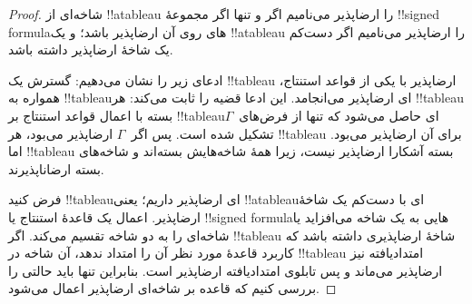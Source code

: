 \documentclass[../../../include/open-logic-section]{subfiles}
\begin{document}
\begin{proof}
شاخه‌ای از !!a{tableau} را ارضاپذیر می‌نامیم اگر و تنها اگر مجموعهٔ
!!{signed formula}های روی آن ارضاپذیر باشد؛ و یک !!a{tableau} را
ارضاپذیر می‌نامیم اگر دست‌کم یک شاخهٔ ارضاپذیر داشته باشد.

ادعای زیر را نشان می‌دهیم: گسترش یک !!{tableau} ارضاپذیر با یکی از
قواعد استنتاج، همواره به !!{tableau}ای ارضاپذیر می‌انجامد. این ادعا
قضیه را ثابت می‌کند: هر !!{tableau} بسته با اعمال قواعد استنتاج بر
!!{tableau}ای حاصل می‌شود که تنها از فرض‌های~$\Gamma$ تشکیل شده است.
پس اگر~$\Gamma$ ارضاپذیر می‌بود، هر !!{tableau} برای آن ارضاپذیر
می‌بود. اما !!{tableau} بسته آشکارا ارضاپذیر نیست، زیرا همهٔ شاخه‌هایش
بسته‌اند و شاخه‌های بسته ارضاناپذیرند.

فرض کنید !!{tableau}ای ارضاپذیر داریم؛ یعنی !!a{tableau}ای با دست‌کم
یک شاخهٔ ارضاپذیر. اعمال یک قاعدهٔ استنتاج یا !!{signed formula}هایی به
یک شاخه می‌افزاید یا شاخه‌ای را به دو شاخه تقسیم می‌کند. اگر
!!{tableau} شاخهٔ ارضاپذیری داشته باشد که کاربرد قاعدهٔ مورد نظر آن را
امتداد ندهد، آن شاخه در !!{tableau} امتدادیافته نیز ارضاپذیر می‌ماند و
پس تابلوی امتدادیافته ارضاپذیر است. بنابراین تنها باید حالتی را بررسی
کنیم که قاعده بر شاخه‌ای ارضاپذیر اعمال می‌شود.


\end{proof}
\end{document}
